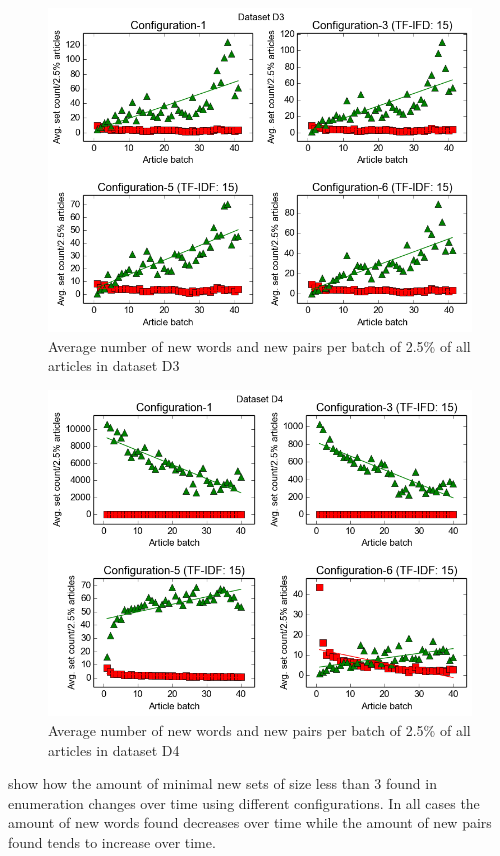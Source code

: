 \begin{figure}[h]
  \centering
  \includegraphics[scale=0.70]{images/D3-plot.png}
  \caption{Average number of new words and new pairs per batch of 2.5\% of all articles in dataset D3}
  \label{fig:setPlot3}
\end{figure}

\begin{figure}[h]
  \centering
  \includegraphics[scale=0.70]{images/D4-plot.png}
  \caption{Average number of new words and new pairs per batch of 2.5\% of all articles in dataset D4}
  \label{fig:setPlot4}
\end{figure}

 show how the amount of minimal new sets of size less than 3 found in enumeration changes over time using different configurations. In all cases the amount of new words found decreases over time while the amount of new pairs found tends to increase over time.
